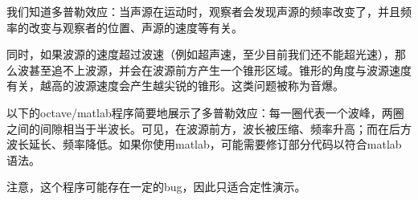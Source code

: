 
我们知道多普勒效应：当声源在运动时，观察者会发现声源的频率改变了，并且频率的改变与观察者的位置、声源的速度等有关。

同时，如果波源的速度超过波速（例如超声速，至少目前我们还不能超光速），那么波甚至追不上波源，并会在波源前方产生一个锥形区域。锥形的角度与波源速度有关，越高的波源速度会产生越尖锐的锥形。这类问题被称为音爆。

以下的octave/matlab程序简要地展示了多普勒效应：每一圈代表一个波峰，两圈之间的间隙相当于半波长。可见，在波源前方，波长被压缩、频率升高；而在后方波长延长、频率降低。如果你使用matlab，可能需要修订部分代码以符合matlab语法。

注意，这个程序可能存在一定的bug，因此只适合定性演示。

